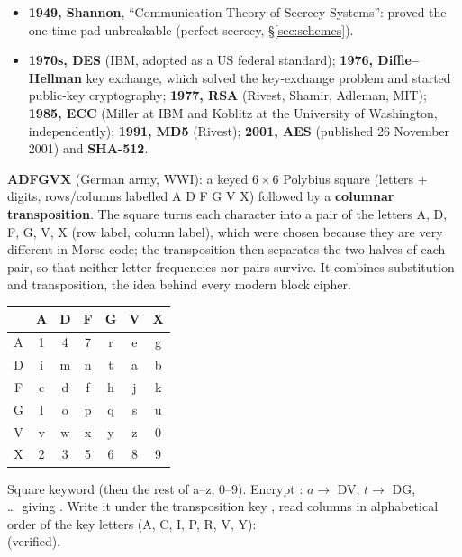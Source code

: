 \begin{itemize}[leftmargin=1.4em]
  \item \textbf{1949, Shannon}, ``Communication Theory of Secrecy Systems'': proved the one-time pad unbreakable (perfect secrecy, \S\ref{sec:schemes}).
  \item \textbf{1970s, DES} (IBM, adopted as a US federal standard); \textbf{1976, Diffie--Hellman} key exchange, which solved the key-exchange problem and started public-key cryptography; \textbf{1977, RSA} (Rivest, Shamir, Adleman, MIT); \textbf{1985, ECC} (Miller at IBM and Koblitz at the University of Washington, independently); \textbf{1991, MD5} (Rivest); \textbf{2001, AES} (published 26 November 2001) and \textbf{SHA-512}.
\end{itemize}

\textbf{ADFGVX} (German army, WWI): a keyed $6 \times 6$ Polybius square (letters $+$ digits, rows/columns labelled A D F G V X) followed by a \textbf{columnar transposition}. The square turns each character into a pair of the letters A, D, F, G, V, X (row label, column label), which were chosen because they are very different in Morse code; the transposition then separates the two halves of each pair, so that neither letter frequencies nor pairs survive. It combines substitution and transposition, the idea behind every modern block cipher.
\begin{center}\small
\begin{tabular}{@{}c|cccccc@{}}
 & A&D&F&G&V&X\\ \midrule
A&1&4&7&r&e&g\\
D&i&m&n&t&a&b\\
F&c&d&f&h&j&k\\
G&l&o&p&q&s&u\\
V&v&w&x&y&z&0\\
X&2&3&5&6&8&9\\
\end{tabular}
\quad
\begin{minipage}{0.55\textwidth}
Square keyword  (then the rest of a--z, 0--9). Encrypt : $a \to$ DV, $t \to$ DG, \dots\ giving . Write it under the transposition key , read columns in alphabetical order of the key letters (A, C, I, P, R, V, Y):\\
 (verified).
\end{minipage}
\end{center}

